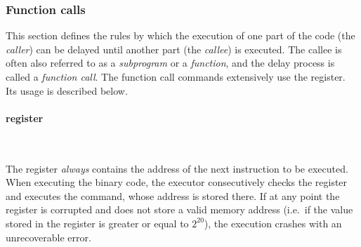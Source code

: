 \hypertarget{cmd:calls}{
    \subsubsection{Function calls}
}


\vspace{0.5cm}

This section defines the rules by which the execution of one part of the code
(the \textit{caller}) can be delayed until another part (the \textit{callee})
is executed.
The callee is often also referred to as a \textit{subprogram} or
a \textit{function}, and the delay process is called a \textit{function call}.
The function call commands extensively use the  register.
Its usage is described below.

\vspace{-0.35cm}

\paragraph{ register}\

The  register \textit{always} contains the address of the next
instruction to be executed.
When executing the binary code, the  executor consecutively checks
the  register and executes the command, whose address is stored there.
If at any point the  register is corrupted and does not store
a valid memory address
(i.e.\ if the value stored in the  register is greater or equal
to $2^{20}$), the execution crashes with an unrecoverable error.

